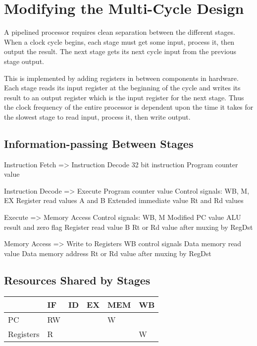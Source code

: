 \section{Modifying the Multi-Cycle Design}
A pipelined processor requires clean separation between the different stages.
When a clock cycle begins, each stage must get some input, process it, then output the result.
The next stage gets its next cycle input from the previous stage output.

This is implemented by adding registers in between components in hardware.
Each stage reads its input register at the beginning of the cycle and writes its result to an output register which is the input register for the next stage.
Thus the clock frequency of the entire processor is dependent upon the time it takes for the slowest stage to read input, process it, then write output.

\subsection{Information-passing Between Stages}
Instruction Fetch => Instruction Decode
32 bit instruction
Program counter value

Instruction Decode => Execute
Program counter value
Control signals: WB, M, EX
Register read values A and B
Extended immediate value
Rt and Rd values

Execute => Memory Access
Control signals: WB, M
Modified PC value
ALU result and zero flag
Register read value B
Rt or Rd value after muxing by RegDst

Memory Access => Write to Registers
WB control signals
Data memory read value
Data memory address
Rt or Rd value after muxing by RegDst

\subsection{Resources Shared by Stages}
\begin{table}[h]
    \begin{tabular}{l|lllll}
    ~         & IF & ID & EX & MEM & WB \\ \hline
    PC        & RW & ~  & ~  & W   & ~  \\
    Registers & R  & ~  & ~  & ~   & W  \\
    \end{tabular}
\end{table}
